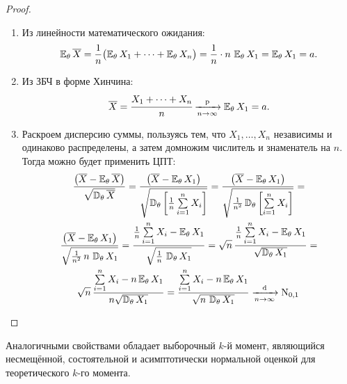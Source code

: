 \begin{proof}
\begin{enumerate}[label={\arabic*.}]
    \item Из линейности математического ожидания:
    \begin{equation*}
        \operatorname{\operatorname{\mathbb{E}}_{\theta}} \overline{X}=\frac{1}{n}\bigl(\operatorname{\operatorname{\mathbb{E}}_{\theta}}  X_{1}+\cdots+\operatorname{\operatorname{\mathbb{E}}_{\theta}} X_{n}\bigr)=\frac{1}{n} \cdot n \, \operatorname{\operatorname{\mathbb{E}}_{\theta}} X_{1}= \operatorname{\operatorname{\mathbb{E}}_{\theta}}  X_{1} = a.
    \end{equation*}
    \item Из ЗБЧ в форме Хинчина:
    \begin{equation*}
        \overline{X} = 
        \cfrac{X_{1}+\cdots+X_{n}}{n} \xrightarrow[n \to \infty]{\text{p}} \operatorname{\operatorname{\mathbb{E}}_{\theta}} X_{1} = a.
    \end{equation*}

    \item Раскроем дисперсию суммы, пользуясь тем, что $X_1, \ldots, X_n$ независимы и одинаково распределены, а затем домножим числитель и знаменатель на $n$. 
    Тогда можно будет применить ЦПТ:
    \begin{gather*}
        \frac{\bigl(\overline{X} - \operatorname{\operatorname{\mathbb{E}}_{\theta}} \overline{X} \bigr)}{\sqrt{\operatorname{\mathbb{D}_{\theta}} \overline{X}}} =
        \frac{\bigl(\overline{X} - \operatorname{\operatorname{\mathbb{E}}_{\theta}} X_{1}\bigr)}{\sqrt{\operatorname{\mathbb{D}_{\theta}} \left[ \frac{1}{n} \sum\limits_{i=1}^n X_i \right]}} = 
        \frac{\bigl(\overline{X} - \operatorname{\operatorname{\mathbb{E}}_{\theta}} X_{1}\bigr)}{\sqrt{\frac{1}{n^2} \operatorname{\mathbb{D}_{\theta}} \left[ \sum\limits_{i=1}^n X_i \right]}} = \\
        \frac{\bigl(\overline{X} - \operatorname{\operatorname{\mathbb{E}}_{\theta}} X_{1}\bigr)}{\sqrt{\frac{1}{n^2} \, n \, \operatorname{\mathbb{D}_{\theta}} X_1}} = 
        \frac{\frac{1}{n}\sum\limits_{i=1}^{n} X_{i} - \operatorname{\operatorname{\mathbb{E}}_{\theta}} X_{1}}{\sqrt{ \frac{1}{n} \, \operatorname{\mathbb{D}_{\theta}} X_1}} = 
        \sqrt{n} \, \frac{\frac{1}{n}\sum\limits_{i=1}^{n} X_{i} - \operatorname{\operatorname{\mathbb{E}}_{\theta}} X_{1}}{\sqrt{\operatorname{\mathbb{D}_{\theta}} X_1}} = \\
        \sqrt{n} \, \frac{\sum\limits_{i=1}^{n} X_{i} - n \operatorname{\operatorname{\mathbb{E}}_{\theta}} X_{1}}{n \sqrt{\operatorname{\mathbb{D}_{\theta}} X_1}} =
        \frac{\sum\limits_{i=1}^{n} X_{i} - n \operatorname{\operatorname{\mathbb{E}}_{\theta}} X_{1}}{\sqrt{n \, \operatorname{\mathbb{D}_{\theta}} X_1}}
        \xrightarrow[n \to \infty]{\text{d}} \operatorname{\mathrm{N}}_{0, 1} \qedhere
    \end{gather*}
\end{enumerate}
\end{proof}

\begin{rmrk}
    Аналогичными свойствами обладает выборочный $k$-й момент, являющийся несмещённой, состоятельной и асимптотически нормальной оценкой для теоретического $k$-го момента.
\end{rmrk}

